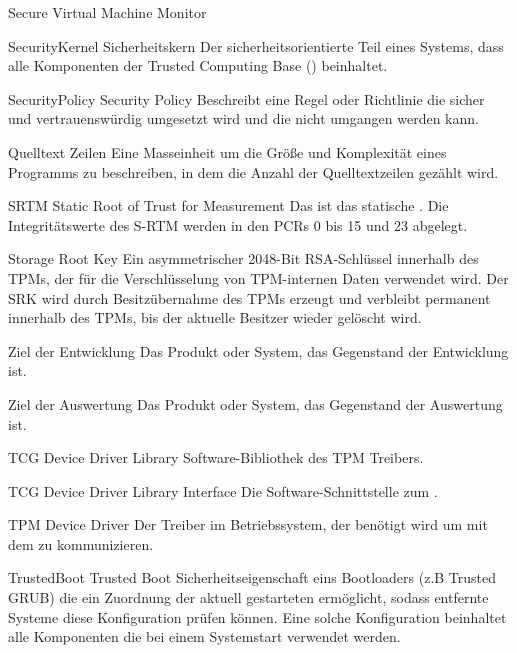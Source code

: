 	{Secure Virtual Machine Monitor}

\glosentry
	{SecurityKernel}
	{Sicherheitskern}
        {Der sicherheitsorientierte Teil eines Systems, dass alle Komponenten
	 der Trusted Computing Base (\TCB) beinhaltet.}

\glosentry
	{SecurityPolicy}
	{Security Policy}
        {Beschreibt eine Regel oder Richtlinie die sicher und
	 vertrauensw\"urdig umgesetzt wird und die nicht umgangen werden kann.}


        {Quelltext Zeilen}
        {Eine Masseinheit um die Gr\"o\ss{}e und Komplexit\"at eines Programms zu
         beschreiben, in dem die Anzahl der Quelltextzeilen gez\"ahlt wird.}

\glosentry
	{SRTM}
	{Static Root of Trust for Measurement}
	{Das \srtm ist das statische \RTM. Die Integrit\"atswerte des S-RTM werden in den PCRs 0 bis 15 und 23 abgelegt.}


	{Storage Root Key}
        {Ein asymmetrischer 2048-Bit RSA-Schl\"ussel innerhalb des TPMs, der f\"ur die Verschl\"usselung von TPM-internen Daten verwendet wird.
	Der SRK wird durch Besitz\"ubernahme des TPMs erzeugt und verbleibt permanent innerhalb des TPMs, bis der aktuelle Besitzer wieder
	gel\"oscht wird.}


	{Ziel der Entwicklung}
	{Das Produkt oder System, das Gegenstand der Entwicklung ist.}

        {Ziel der Auswertung}
        {Das Produkt oder System, das Gegenstand der Auswertung ist.}



	{TCG Device Driver Library}
        {Software-Bibliothek des TPM Treibers.}


	{TCG Device Driver Library Interface}
        {Die Software-Schnittstelle zum \TDDL.}

	{TPM Device Driver}
        {Der Treiber im Betriebssystem, der ben\"otigt wird um mit dem \TPM zu
	 kommunizieren.}


\glosentry
	{TrustedBoot}
	{Trusted Boot}
        {Sicherheitseigenschaft eins Bootloaders (z.B Trusted GRUB) die ein
 	 Zuordnung der aktuell gestarteten \TCB erm\"oglicht, sodass entfernte
	 Systeme diese Konfiguration pr\"ufen k\"onnen. Eine solche
	 Konfiguration beinhaltet alle Komponenten die bei einem Systemstart
	 verwendet werden.}


